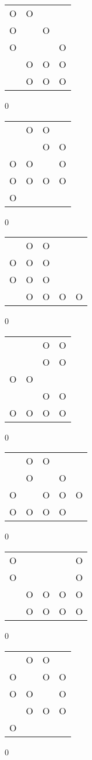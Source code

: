 \begin{tabular}{|m{0.2cm}m{0.2cm}m{0.2cm}m{0.2cm}|}\hline
O&O& & \\
O& &O& \\
O& & &O\\
 &O&O&O\\
 &O&O&O\\
\hline\end{tabular}0
\begin{tabular}{|m{0.2cm}m{0.2cm}m{0.2cm}m{0.2cm}|}\hline
 &O&O& \\
 & &O&O\\
O&O& &O\\
O&O&O&O\\
O& & & \\
\hline\end{tabular}0
\begin{tabular}{|m{0.2cm}m{0.2cm}m{0.2cm}m{0.2cm}m{0.2cm}|}\hline
 &O&O& & \\
O&O&O& & \\
O&O&O& & \\
 &O&O&O&O\\
\hline\end{tabular}0
\begin{tabular}{|m{0.2cm}m{0.2cm}m{0.2cm}m{0.2cm}|}\hline
 & &O&O\\
 & &O&O\\
O&O& & \\
 & &O&O\\
O&O&O&O\\
\hline\end{tabular}0
\begin{tabular}{|m{0.2cm}m{0.2cm}m{0.2cm}m{0.2cm}m{0.2cm}|}\hline
 &O&O& & \\
 &O& &O& \\
O& &O&O&O\\
O&O&O&O& \\
\hline\end{tabular}0
\begin{tabular}{|m{0.2cm}m{0.2cm}m{0.2cm}m{0.2cm}m{0.2cm}|}\hline
O& & & &O\\
O& & & &O\\
 &O&O&O&O\\
 &O&O&O&O\\
\hline\end{tabular}0
\begin{tabular}{|m{0.2cm}m{0.2cm}m{0.2cm}m{0.2cm}|}\hline
 &O&O& \\
O& &O&O\\
O&O& &O\\
 &O&O&O\\
O& & & \\
\hline\end{tabular}0
